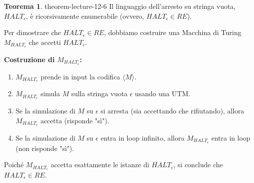 \documentclass[a4paper]{article}
\makeatletter
\theoremstyle{definition} %
\newtheorem{theorem}{Teorema}
[section] %
\renewenvironment{proof}[1][\proofname]{\par
  \pushQED{\qed}%
  \normalfont \topsep6\p@\@plus6\p@\relax
  \trivlist
  \item[\hskip\labelsep
        \bfseries
    #1\@addpunct{.}]\ignorespaces
}{%
  \popQED\endtrivlist\@endpefalse
}
\makeatother
\begin{document}
\begin{theorem}{}{{ theorem-lecture-12-6 }}
Il linguaggio dell'arresto su stringa vuota, $HALT_\epsilon$, è ricorsivamente enumerabile (ovvero, $HALT_\epsilon \in RE$).
\end{theorem}
\begin{proof}
Per dimostrare che $HALT_\epsilon \in RE$, dobbiamo costruire una Macchina di Turing $M_{HALT_\epsilon}$ che accetti $HALT_\epsilon$.

\textbf{Costruzione di $M_{HALT_\epsilon}$:}
\begin{enumerate}
    \item $M_{HALT_\epsilon}$ prende in input la codifica $\langle M \rangle$.
    \item $M_{HALT_\epsilon}$ simula $M$ sulla stringa vuota $\epsilon$ usando una UTM.
    \item Se la simulazione di $M$ su $\epsilon$ si arresta (sia accettando che rifiutando), allora $M_{HALT_\epsilon}$ accetta (risponde "sì").
    \item Se la simulazione di $M$ su $\epsilon$ entra in loop infinito, allora $M_{HALT_\epsilon}$ entra in loop (non risponde "sì").
\end{enumerate}
Poiché $M_{HALT_\epsilon}$ accetta esattamente le istanze di $HALT_\epsilon$, si conclude che $HALT_\epsilon \in RE$.
\end{proof}
\end{document}
